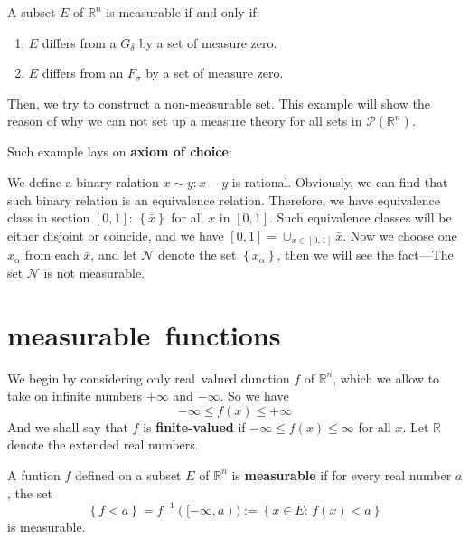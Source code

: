 \documentclass{ctexbook}
\begin{document}
\begin{cor}
    A subset $E$ of $\mathbb{R}^n $ is measurable if and only if:
    \begin{enumerate}
        \item $E$ differs from a $G_{\delta}$ by a set of measure zero.
        \item $E$ differs from an $F_{\sigma}$ by a set of measure zero.
    \end{enumerate}  
\end{cor}

Then, we try to construct a non-measurable set. This example will show the reason of why we can not set up a measure theory
for all sets in $\mathscr{P}(\mathbb{R}^n)$.

Such example lays on \textbf{axiom of choice}:
\begin{fact}
    We define a binary ralation $x\sim y:x-y$ is rational. Obviously, we can find that such binary relation is an equivalence
    relation. Therefore, we have equivalence class in section $[0,1]$: $\left\{\bar{x}\right\} $ for all $x$ in $[0,1]$. Such
    equivalence classes will be either disjoint or coincide, and we have $[0,1]=\cup_{x \in [0,1]}\bar{x}$. Now we
    choose one $x_\alpha$ from each $\bar{x}$, and let $\mathscr{N}$ denote the set $\left\{x_\alpha\right\}$, then we will see
    the fact---The set $\mathscr{N}$ is not measurable.
\end{fact}

\section{measurable~functions}

We begin by considering only real~valued dunction $f$ of $\mathbb{R}^n$, which we allow to take on infinite numbers $+\infty$ and 
$-\infty$. So we have \[-\infty \leq f(x) \leq +\infty\]And we shall say that $f$ is \textbf{finite-valued} if $-\infty \leq f(x) \leq \infty$
for all $x$. Let $\overline{\mathbb{R}}$ denote the extended real numbers.

\begin{define}
    A funtion $f$ defined on a subset $E$ of $\mathbb{R}^n$ is \textbf{measurable} if for every real number $a$, the set
    \[\left\{f < a\right\} =f^{-1}([-\infty,a)):= \left\{x \in E:\, f(x)<a\right\} \]
    is measurable.
\end{define}
\end{document}
